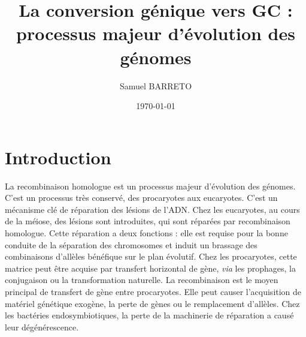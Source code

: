 \documentclass[11pt, oneside]{scrartcl}
\author{Samuel BARRETO}
\date{\today}
\title{La conversion génique vers GC : processus majeur d'évolution des génomes}
\begin{document}


\section*{Introduction}
\label{sec:orgheadline1}

La recombinaison homologue est un processus majeur d'évolution des génomes.
C'est un processus très conservé, des procaryotes aux
eucaryotes\cite{cromie_recombination_2001}. C'est un mécanisme clé de réparation
des lésions de l'ADN. Chez les eucaryotes, au cours de la méiose, des lésions
sont introduites, qui sont réparées par recombinaison homologue. Cette
réparation a deux fonctions : elle est requise pour la bonne conduite de la
séparation des chromosomes et induit un brassage des combinaisons d'allèles
bénéfique sur le plan évolutif\cite{webster_direct_2012}. Chez les procaryotes,
cette matrice peut être acquise par transfert horizontal de gène, \emph{via} les
prophages, la conjugaison ou la transformation naturelle. La recombinaison est
le moyen principal de transfert de gène entre procaryotes. Elle peut causer
l'acquisition de matériel génétique exogène, la perte de gènes ou le
remplacement d'allèles\cite{coupat-goutaland_ralstonia_2011}. Chez les bactéries
endosymbiotiques, la perte de la machinerie de réparation a causé leur
dégénérescence\cite{moran_genomics_2008}.
\end{document}
